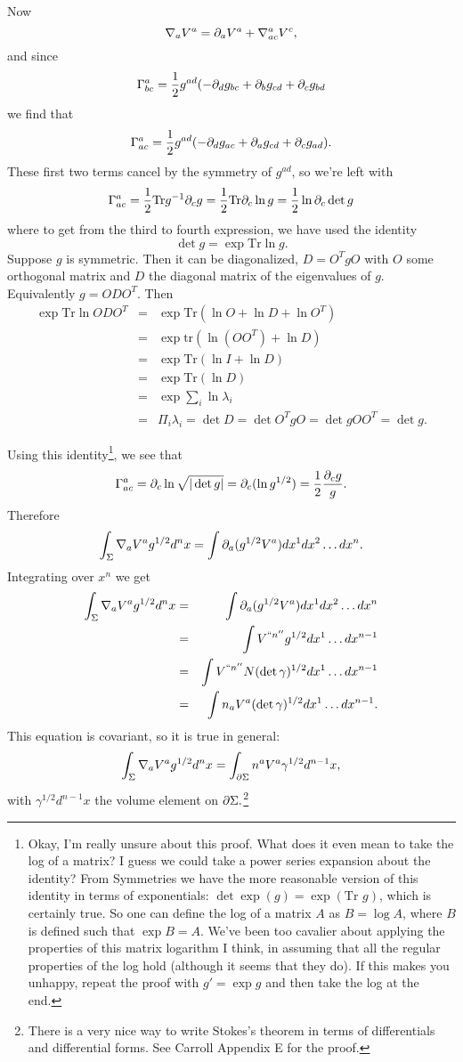 Now
$$\nabla_a V^a=\partial_a V^a +\nabla^a_{ac} V^c,$$
and since
$$\Gamma^a_{bc}=\frac{1}{2}g^{ad}(-\partial_d g_{bc}+\partial_b g_{cd}+\partial_c g_{bd}$$
we find that
$$\Gamma^a_{ac}=\frac{1}{2}g^{ad}(-\partial_d g_{ac}+\partial_a g_{cd}+\partial_c g_{ad}).$$
These first two terms cancel by the symmetry of $g^{ad}$, so we're left with
$$\Gamma^a_{ac}=\frac{1}{2} \text{Tr} g^{-1}\partial_c g=\frac{1}{2}\text{Tr}\partial_c \ln g = \frac{1}{2} \ln \partial_c \det g$$
where to get from the third to fourth expression, we have used the identity
$$\det g = \exp \text{Tr} \ln g.$$
Suppose $g$ is symmetric. Then it can be diagonalized, $D=O^T g O$ with $O$ some orthogonal matrix and $D$ the diagonal matrix of the eigenvalues of $g$. Equivalently $g=O DO^T.$ Then
\begin{eqnarray*}
\exp \text{Tr}\ln ODO^T&=&\exp \text{Tr}(\ln O + \ln D + \ln O^T)\\
&=&\exp \text{tr}(\ln (O O ^T)+\ln D)\\
&=&\exp \text{Tr}(\ln I + \ln D)\\
&=& \exp \text{Tr}(\ln D)\\
&=&\exp \sum_i \ln \lambda_i\\
&=&\Pi_i \lambda_i = \det D = \det O^T g O = \det g O O^T = \det g.
\end{eqnarray*}

Using this identity\footnote{Okay, I'm really unsure about this proof. What does it even mean to take the log of a matrix? I guess we could take a power series expansion about the identity? From Symmetries we have the more reasonable version of this identity in terms of exponentials: $\det \exp(g)= \exp (\text{Tr } g)$, which is certainly true. So one can define the log of a matrix $A$ as $B=\log A$, where $B$ is defined such that $\exp B = A$. We've been too cavalier about applying the properties of this matrix logarithm I think, in assuming that all the regular properties of the log hold (although it seems that they do). If this makes you unhappy, repeat the proof with $g'=\exp g$ and then take the log at the end.}, 
we see that
$$\Gamma^a_{ac}=\partial_c \ln \sqrt{|\det g|}=\partial_c(\ln g^{1/2})=\frac{1}{2} \frac{\partial_c g}{g}.$$ Therefore
$$\int_\Sigma \nabla_a V^a g^{1/2} d^n x=\int \partial_a(g^{1/2} V^a) dx^1 dx^2 \ldots dx^n.$$
Integrating over $x^n$ we get
\begin{eqnarray*}
\int_\Sigma \nabla_a V^a g^{1/2} d^n x&=&\int \partial_a(g^{1/2} V^a) dx^1 dx^2 \ldots dx^n\\
&=& \int V^{``n''} g^{1/2} dx^1 \ldots dx^{n-1}\\
&=& \int V^{``n''}N(\det \gamma)^{1/2} dx^1 \ldots dx^{n-1}\\
&=& \int n_a V^a (\det \gamma)^{1/2} dx^1 \ldots dx^{n-1}.
\end{eqnarray*}
This equation is covariant, so it is true in general:
$$\int_\Sigma \nabla_a V^a g^{1/2} d^n x = \int_{\partial \Sigma} n^a V^a \gamma^{1/2} d^{n-1}x,$$ with $\gamma^{1/2}d^{n-1}x$ the volume element on $\partial \Sigma.$\footnote{There is a very nice way to write Stokes's theorem in terms of differentials and differential forms. See Carroll Appendix E for the proof.}